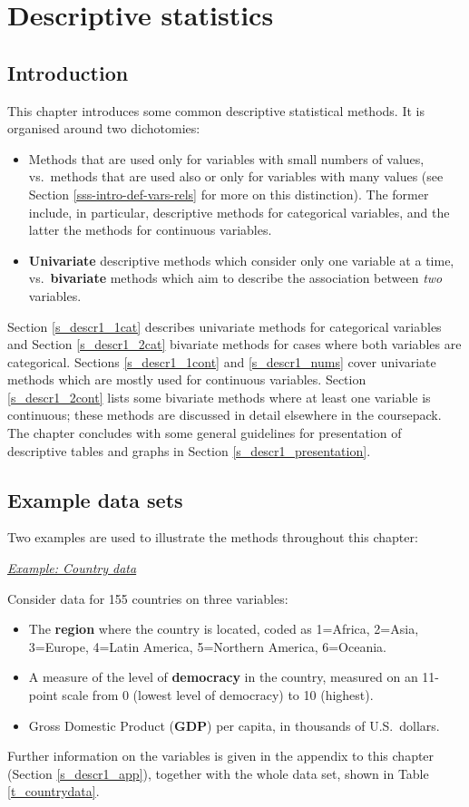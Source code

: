 \chapter{Descriptive statistics} \label{c_descr1}

\section{Introduction}
\label{s_descr1_intro}

This chapter introduces some common descriptive statistical methods. It
is organised around two dichotomies:
\begin{itemize}
\item
Methods that are used only for variables with small numbers of values,
vs.\ methods that are used also or only for variables with many
values (see Section \ref{sss-intro-def-vars-rels} for more on this
distinction). The former include, in particular, descriptive methods for
categorical variables, and the latter the methods for continuous
variables.
\item
\textbf{Univariate} descriptive methods which consider only one variable at a
time, vs.\ \textbf{bivariate} methods which aim to describe the association
between \emph{two} variables.
\end{itemize}
Section \ref{s_descr1_1cat} describes univariate methods for categorical
variables and Section \ref{s_descr1_2cat} bivariate methods for cases
where both variables are categorical. Sections \ref{s_descr1_1cont} and
\ref{s_descr1_nums} cover univariate methods which are mostly used for continuous
variables.
Section \ref{s_descr1_2cont} lists some bivariate
methods where at least one variable is continuous; these methods are
discussed in detail elsewhere in the coursepack.
The chapter concludes with some general guidelines
for presentation of descriptive tables and graphs in Section
\ref{s_descr1_presentation}.

\section{Example data sets}
\label{s_descr1_examples}

Two examples are used to illustrate the methods throughout this chapter:

\underline{\emph{Example: Country data}}\label{country_example}

Consider data for 155 countries on three
variables:
\begin{itemize}
\item
The \textbf{region} where the country is located,
coded as 1=Africa, 2=Asia, 3=Europe, 4=Latin America, 5=Northern
America, 6=Oceania.
\item
A measure of the level of \textbf{democracy} in the country, measured on
an 11-point scale from 0 (lowest level of democracy) to 10 (highest).
\item
Gross Domestic Product (\textbf{GDP})
per capita, in thousands of U.S.\ dollars.
\end{itemize}
Further information on the variables is given in the appendix to this
chapter (Section \ref{s_descr1_app}), together with the whole data set,
shown in Table \ref{t_countrydata}.

